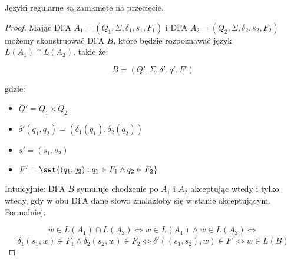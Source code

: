 \begin{theorem}
	Języki regularne są zamknięte na przecięcie.
\end{theorem}
\begin{proof}
	Mając DFA \(A_1 = (Q_1, \Sigma, \delta_1, s_1, F_1)\) i DFA \(A_2 = (Q_2, \Sigma, \delta_2, s_2, F_2)\) możemy skonstruować DFA \(B\), które będzie rozpoznawać język \(L(A_1) \cap L(A_2)\), takie że:

	\[
		B = (Q', \Sigma, \delta', q', F')
	\]

	gdzie:

	\begin{itemize}
		\item \( Q' = Q_1 \times Q_2 \)
		\item \( \delta'(q_1, q_2) = (\delta_1(q_1), \delta_2(q_2)) \)
		\item \( s' = (s_1, s_2) \)
		\item \( F' = \set{(q_1, q_2) : q_1 \in F_1 \land q_2 \in F_2} \)

	\end{itemize}

	Intuicyjnie: DFA \(B\) symuluje chodzenie po \(A_1\) i \(A_2\) akceptując wtedy i tylko wtedy, gdy w obu DFA dane słowo znalazłoby się w stanie akceptującym. Formalniej:

	\[
		w \in L(A_1) \cap L(A_2) \iff w \in L(A_1) \land w \in L(A_2) \iff
	\]
	\[
		\tilde \delta_1(s_1, w) \in F_1 \land \tilde \delta_2(s_2, w) \in F_2 \iff \delta'((s_1, s_2), w) \in F' \iff w \in L(B)
	\]

\end{proof}